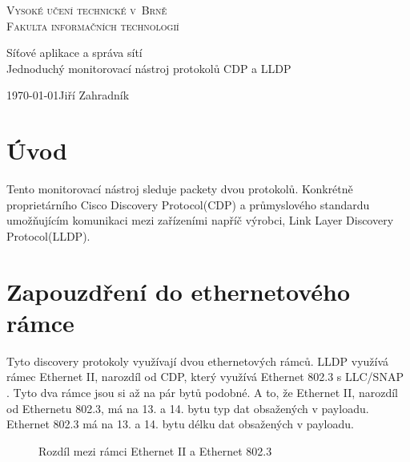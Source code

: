 \documentclass[a4paper,12pt]{article}
\begin{document}
		\begin{titlepage}
			\begin{center}
				\Huge
				\textsc{Vysoké učení technické v~Brně\\
					\huge Fakulta informačních technologií\\}
				
				
				\Large Síťové aplikace a správa sítí\\
				\Huge 	Jednoduchý monitorovací nástroj protokolů CDP a LLDP
				
			\end{center}
			\Large {\today \hfill Jiří Zahradník}
		\end{titlepage}
	
	\pagebreak
	
	\tableofcontents
	
	
	\pagebreak
	
	\section{Úvod}
		Tento monitorovací nástroj sleduje packety dvou protokolů. Konkrétně proprietárního
		Cisco Discovery Protocol(CDP)  a průmyslového standardu umožňujícím komunikaci mezi zařízeními napříč výrobci, Link Layer Discovery Protocol(LLDP).
		
	\section{Zapouzdření do ethernetového rámce}
		Tyto discovery protokoly využívají dvou ethernetových rámců. LLDP využívá rámec Ethernet II, narozdíl od CDP, který využívá Ethernet 802.3 s LLC/SNAP \cite{wireshark:ethernet}.
		Tyto dva rámce jsou si až na pár bytů podobné. A to, že Ethernet II, narozdíl od Ethernetu 802.3, má na 13. a 14. bytu typ dat obsažených v payloadu. Ethernet 802.3 má na 13. a 14. bytu délku dat obsažených v payloadu.
		
		\begin{figure}[h]	
			\begin{center}
				\caption{Rozdíl mezi rámci Ethernet II a Ethernet 802.3}
				\label{pic:etherVsEther}
			\end{center}
		\end{figure}
		
\end{document}
